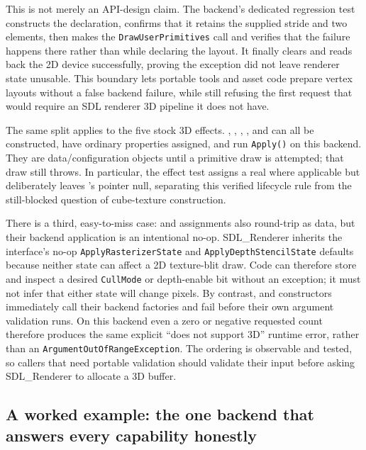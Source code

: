 This is not merely an API-design claim.  The backend's dedicated regression test constructs
the declaration, confirms that it retains the supplied stride and two elements, then makes the
\texttt{DrawUserPrimitives} call and verifies that the failure happens there rather than while
declaring the layout.  It finally clears and reads back the 2D device successfully, proving
the exception did not leave renderer state unusable.  This boundary lets portable tools and
asset code prepare vertex layouts without a false backend failure, while still refusing the
first request that would require an SDL renderer 3D pipeline it does not have.

The same split applies to the five stock 3D effects.  ,
, , ,
and  can all be constructed, have ordinary properties assigned, and
run \texttt{Apply()} on this backend.  They are data/configuration objects until a primitive
draw is attempted; that draw still throws.  In particular, the effect test assigns a real
 where applicable but deliberately leaves
's  pointer null, separating this
verified lifecycle rule from the still-blocked question of cube-texture construction.

There is a third, easy-to-miss case:  and
 assignments also round-trip as data, but their backend application
is an intentional no-op.  SDL\_Renderer inherits the interface's no-op
\texttt{ApplyRasterizerState} and \texttt{ApplyDepthStencilState} defaults because neither
state can affect a 2D texture-blit draw.  Code can therefore store and inspect a desired
\texttt{CullMode} or depth-enable bit without an exception; it must not infer that either
state will change pixels.  By contrast,  and 
constructors immediately call their backend factories and fail before their own argument
validation runs.  On this backend even a zero or negative requested count therefore produces
the same explicit ``does not support 3D'' runtime error, rather than an
\texttt{ArgumentOutOfRangeException}.  The ordering is observable and tested, so callers that
need portable validation should validate their input before asking SDL\_Renderer to allocate a
3D buffer.

\subsection{A worked example: the one backend that answers every capability honestly}

